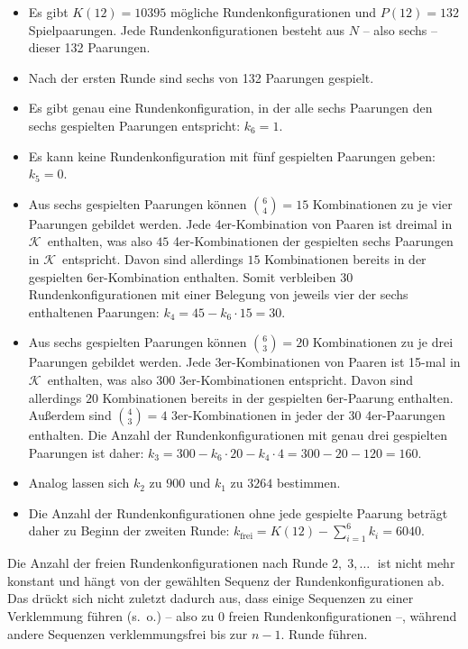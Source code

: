 \documentclass[DIV=15, 10pt]{scrartcl}
\newcommand{\KSet}{$\mathcal{K}$}
\begin{document}
\begin{itemize}

\item Es gibt $K(12) = 10395$ mögliche Rundenkonfigurationen und $P(12) = 132$ Spielpaarungen. Jede Rundenkonfigurationen besteht aus $N$ -- also sechs -- dieser 132 Paarungen.

\item Nach der ersten Runde sind sechs von 132 Paarungen gespielt.

\item Es gibt genau eine Rundenkonfiguration, in der alle sechs Paarungen den sechs gespielten Paarungen entspricht: $k_6 = 1$.

\item Es kann keine Rundenkonfiguration mit fünf gespielten Paarungen geben: $k_5 = 0$.

\item Aus sechs gespielten Paarungen können ${6\choose4} = 15$ Kombinationen zu je vier Paarungen gebildet werden. Jede 4er-Kombination von Paaren ist dreimal in \KSet\ enthalten, was also $45$ 4er-Kombinationen der gespielten sechs Paarungen in \KSet\ entspricht. Davon sind allerdings $15$ Kombinationen bereits in der gespielten 6er-Kombination enthalten. Somit verbleiben $30$ Rundenkonfigurationen mit einer Belegung von jeweils vier der sechs enthaltenen Paarungen: $k_4 = 45 - k_6 \cdot 15 = 30$.

\item Aus sechs gespielten Paarungen können ${6\choose3} = 20$ Kombinationen zu je drei Paarungen gebildet werden. Jede 3er-Kombinationen von Paaren ist 15-mal in \KSet\ enthalten, was also 300 3er-Kombinationen entspricht. Davon sind allerdings $20$ Kombinationen bereits in der gespielten 6er-Paarung enthalten. Außerdem sind ${4\choose3} = 4$ 3er-Kombinationen in jeder der $30$ 4er-Paarungen enthalten. Die Anzahl der Rundenkonfigurationen mit genau drei gespielten Paarungen ist daher: $k_3 = 300 - k_6\cdot20 - k_4 \cdot 4 = 300 - 20 - 120 = 160$.

\item Analog lassen sich $k_2$ zu $900$ und $k_1$ zu $3264$ bestimmen.

\item Die Anzahl der Rundenkonfigurationen ohne jede gespielte Paarung beträgt daher zu Beginn der zweiten Runde: $k_{\text{frei}} = K(12) - \sum_{i=1}^6{k_i} = 6040$.

\end{itemize}

Die Anzahl der freien Rundenkonfigurationen nach Runde $2, \; 3, \ldots \;$ ist nicht mehr konstant und hängt von der gewählten Sequenz der Rundenkonfigurationen ab. Das drückt sich nicht zuletzt dadurch aus, dass einige Sequenzen zu einer Verklemmung führen (s.~o.) -- also zu $0$ freien Rundenkonfigurationen --, während andere Sequenzen verklemmungsfrei bis zur $n-1$. Runde führen.
\end{document}
